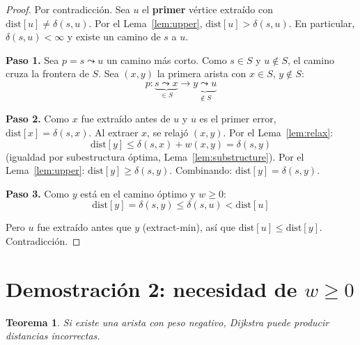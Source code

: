 \documentclass[11pt, letterpaper]{article}
\theoremstyle{definition}
\theoremstyle{plain}
\newtheorem{theorem}{Teorema}[section]
\theoremstyle{remark}
\begin{document}
\begin{proof}
Por contradicción. Sea $u$ el \textbf{primer} vértice extraído con
$\mathrm{dist}[u] \neq \delta(s,u)$. Por el
Lema~\ref{lem:upper}, $\mathrm{dist}[u] > \delta(s,u)$. En
particular, $\delta(s,u) < \infty$ y existe un camino de $s$ a $u$.

\textbf{Paso 1.} Sea $p = s \leadsto u$ un camino más corto. Como
$s \in S$ y $u \notin S$, el camino cruza la frontera de $S$. Sea
$(x,y)$ la primera arista con $x \in S$, $y \notin S$:
\[
  p: \underbrace{s \leadsto x}_{\in S}
  \to \underbrace{y \leadsto u}_{\notin S}
\]

\textbf{Paso 2.} Como $x$ fue extraído antes de $u$ y $u$ es el
primer error, $\mathrm{dist}[x] = \delta(s,x)$. Al extraer $x$, se
relajó $(x,y)$. Por el Lema~\ref{lem:relax}:
\[
  \mathrm{dist}[y] \leq \delta(s,x) + w(x,y) = \delta(s,y)
\]
(igualdad por subestructura óptima, Lema~\ref{lem:substructure}).
Por el Lema~\ref{lem:upper}:
$\mathrm{dist}[y] \geq \delta(s,y)$. Combinando:
$\mathrm{dist}[y] = \delta(s,y)$.

\textbf{Paso 3.} Como $y$ está en el camino óptimo y
$w \geq 0$:
\[
  \mathrm{dist}[y] = \delta(s,y) \leq \delta(s,u)
  < \mathrm{dist}[u]
\]

Pero $u$ fue extraído antes que $y$ (extract-min), así que
$\mathrm{dist}[u] \leq \mathrm{dist}[y]$.
Contradicción.
\end{proof}

\section{Demostración 2: necesidad de $w \geq 0$}

\begin{theorem}\label{thm:nonneg}
Si existe una arista con peso negativo, Dijkstra puede producir
distancias incorrectas.
\end{theorem}
\end{document}
